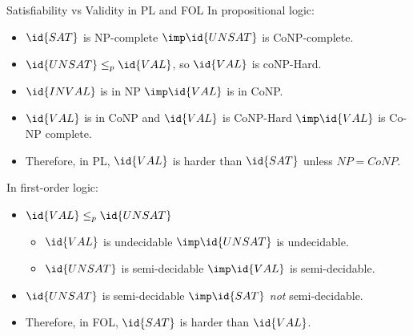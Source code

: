 \begin{wideslide}[bm=,toc=]{Satisfiability vs Validity in PL and FOL}
In propositional logic:
\begin{itemize}
\item $\id{SAT}$ is NP-complete $\imp \id{UNSAT}$ is CoNP-complete. 
\item $\id{UNSAT} \leq_p \id{VAL}$, so $\id{VAL}$ is coNP-Hard.
\item $\id{INVAL}$ is in NP $\imp \id{VAL}$ is in CoNP.
\item $\id{VAL}$ is in CoNP and $\id{VAL}$ is CoNP-Hard $\imp \id{VAL}$ is Co-NP
complete.
\item Therefore, in PL, $\id{VAL}$ is harder than $\id{SAT}$ unless $NP = CoNP$.
\end{itemize}
In first-order logic:
\begin{itemize}
\item $\id{VAL} \leq_p \id{UNSAT}$
\begin{itemize}
\item $\id{VAL}$ is undecidable $\imp \id{UNSAT}$ is undecidable. 
\item $\id{UNSAT}$ is semi-decidable $\imp \id{VAL}$ is semi-decidable. 
\end{itemize}
\item $\id{UNSAT}$ is semi-decidable $\imp \id{SAT}$ \emph{not} semi-decidable. 
\item Therefore, in FOL, $\id{SAT}$ is harder than $\id{VAL}$.
\end{itemize}
\end{wideslide}



